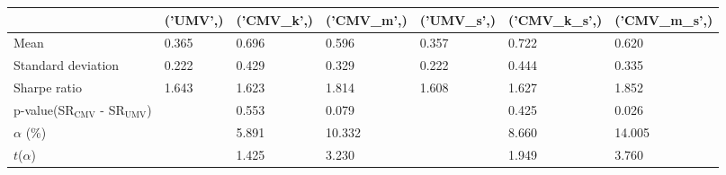 \begin{tabular}{lllllll}
\toprule
 & ('UMV',) & ('CMV_k',) & ('CMV_m',) & ('UMV_s',) & ('CMV_k_s',) & ('CMV_m_s',) \\
\midrule
Mean & 0.365 & 0.696 & 0.596 & 0.357 & 0.722 & 0.620 \\
Standard deviation & 0.222 & 0.429 & 0.329 & 0.222 & 0.444 & 0.335 \\
Sharpe ratio & 1.643 & 1.623 & 1.814 & 1.608 & 1.627 & 1.852 \\
p-value(SR$_{\text{CMV}}$ - SR$_{\text{UMV}}$) &  & 0.553 & 0.079 &  & 0.425 & 0.026 \\
$\alpha$ (\%) &  & 5.891 & 10.332 &  & 8.660 & 14.005 \\
$t$($\alpha$) &  & 1.425 & 3.230 &  & 1.949 & 3.760 \\
\bottomrule
\end{tabular}
